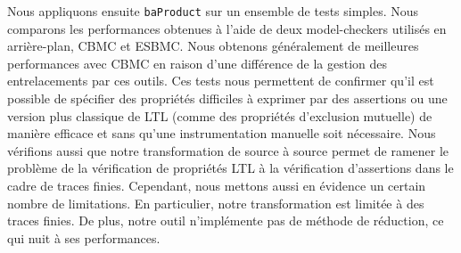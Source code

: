 Nous appliquons ensuite \texttt{baProduct} sur un ensemble de tests simples.
Nous comparons les performances obtenues à l'aide de deux model-checkers
utilisés en arrière-plan, CBMC et ESBMC. Nous obtenons généralement de
meilleures performances avec CBMC en raison d'une différence de la gestion des
entrelacements par ces outils. Ces tests nous permettent de confirmer qu'il est
possible de spécifier des propriétés difficiles à exprimer par des assertions ou
une version plus classique de LTL (comme des propriétés d'exclusion mutuelle)
de manière efficace et sans qu'une instrumentation manuelle soit nécessaire.
Nous vérifions aussi que notre transformation de source à source permet de
ramener le problème de la vérification de propriétés LTL à la vérification
d'assertions dans le cadre de traces finies. Cependant, nous mettons aussi en
évidence un certain nombre de limitations. En particulier, notre transformation
est limitée à des traces finies. De plus, notre outil n'implémente pas de
méthode de réduction, ce qui nuit à ses performances.